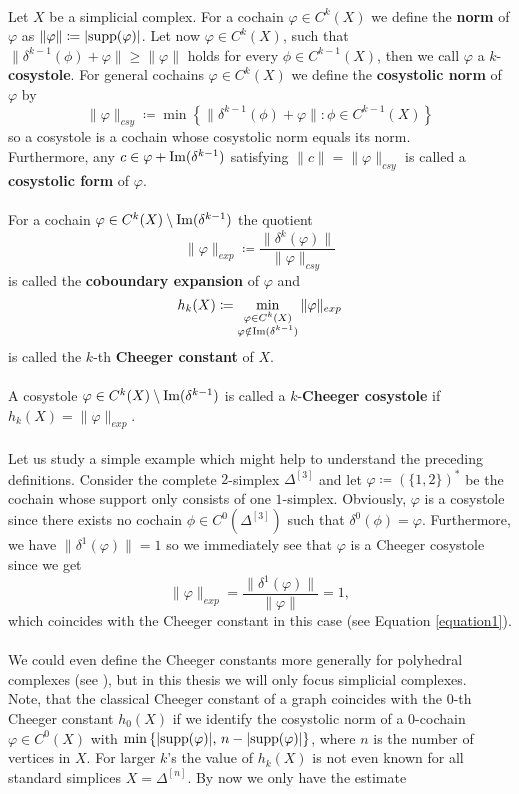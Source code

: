 \\
Let \(X\) be a simplicial complex. For a cochain \(\varphi\in C^k(X)\) we define the \textbf{norm} of \(\varphi\) as \(\|\varphi\|\coloneqq |\mathrm{supp}(\varphi)|\). Let now \(\varphi\in C^k(X)\), such that \(\|\delta^{k-1}(\phi)+\varphi\|\geq\|\varphi\|\) holds for every \(\phi\in C^{k-1}(X)\), then we call \(\varphi\) a \(k\)-\textbf{cosystole}. For general cochains \(\varphi\in C^k(X)\) we define the \textbf{cosystolic norm} of \(\varphi\) by
\[
\|\varphi\|_{csy}\coloneqq \min\left\{\|\delta^{k-1}(\phi)+\varphi\|:\phi\in C^{k-1}(X)\right\}
\]
so a cosystole is a cochain whose cosystolic norm equals its norm.\\
Furthermore, any \(c\in \varphi+\mathrm{Im}(\delta^{k-1})\) satisfying \(\|c\|=\|\varphi\|_{csy}\) is called a \textbf{cosystolic form} of \(\varphi\).\\
\\
For a cochain \(\varphi\in C^k(X)\setminus\mathrm{Im}(\delta^{k-1})\) the quotient
\[
\|\varphi\|_{exp}\coloneqq \frac{\|\delta^k(\varphi)\|}{\|\varphi\|_{csy}}
\]
is called the \textbf{coboundary expansion} of \(\varphi\) and
\[
h_k(X)\coloneqq \min_{\substack{\varphi\in C^k(X)\\\varphi\notin\mathrm{Im}(\delta^{k-1})}}\|\varphi\|_{exp}
\]
is called the \(k\)-th \textbf{Cheeger constant} of \(X\).\\
\\
A cosystole \(\varphi\in C^k(X)\setminus\mathrm{Im}(\delta^{k-1})\) is called a \(k\)-\textbf{Cheeger cosystole} if \(h_k(X)=\|\varphi\|_{exp}\).\\
\\
Let us study a simple example which might help to understand the preceding definitions. Consider the complete \(2\)-simplex \(\Delta^{[3]}\) and let \(\varphi\coloneqq (\{1,2\})^*\) be the cochain whose support only consists of one \(1\)-simplex. Obviously, \(\varphi\) is a cosystole since there exists no cochain \(\phi\in C^0(\Delta^{[3]})\) such that \(\delta^0(\phi)=\varphi\). Furthermore, we have \(\|\delta^1(\varphi)\|=1\) so we immediately see that \(\varphi\) is a Cheeger cosystole since we get
\[
\|\varphi\|_{exp}=\frac{\|\delta^1(\varphi)\|}{\|\varphi\|}=1,
\]
which coincides with the Cheeger constant in this case (see Equation \ref{equation1}).\\
\\
We could even define the Cheeger constants more generally for polyhedral complexes (see \cite{6}), but in this thesis we will only focus simplicial complexes.\\
Note, that the classical Cheeger constant of a graph coincides with the \(0\)-th Cheeger constant \(h_0(X)\) if we identify the cosystolic norm of a \(0\)-cochain \(\varphi\in C^0(X)\) with \(\min\left\{|\mathrm{supp}(\varphi)|\text{, }n-|\mathrm{supp}(\varphi)|\right\}\), where \(n\) is the number of vertices in \(X\). For larger \(k\)'s the value of \(h_k(X)\) is not even known for all standard simplices \(X=\Delta^{[n]}\). By now we only have the estimate

